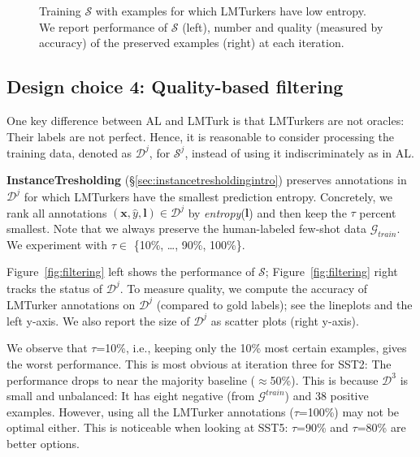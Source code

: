 \documentclass[11pt]{article}
\def\md{LMTurk\xspace}
\def\mdr{LMTurker\xspace}
\def\mdrs{LMTurkers\xspace}
\def\figref#1{Figure~\ref{fig:#1}}
\def\figlabel#1{\label{fig:#1}\label{p:#1}}
\def\secref#1{\S\ref{sec:#1}}
\def\seclabel#1{\label{sec:#1}}
\begin{document}
\begin{figure}[t]
{}
\vspace{-.25cm}
\caption{
  Training $\mathcal{S}$
  with
  examples for which \mdrs have low entropy.
  We report performance of $\mathcal{S}$ (left),
  number and quality (measured by accuracy) of the
  preserved examples (right) at each iteration.
}
\figlabel{filtering}
\end{figure}




\subsection{Design choice 4: Quality-based filtering}
\seclabel{poolfilter}
One key difference between AL and \md
is that \mdrs are not oracles:
Their labels are not perfect.
Hence, it is reasonable to
consider processing the training
data, denoted as $\mathcal{D}^{j}$, for $\mathcal{S}^{j}$, instead
of using it indiscriminately as in AL.


\textbf{InstanceTresholding} (\secref{instancetresholdingintro})
preserves
annotations
in $\mathcal{D}^{j}$
for which \mdrs
have the smallest
prediction entropy.
Concretely,
we rank all annotations
$(\mathbf{x}, \hat{y}, \mathbf{l}) \in \mathcal{D}^{j}$
by \emph{entropy}($\mathbf{l}$)
and then keep the
$\tau$ percent smallest.
Note that we always preserve the human-labeled
few-shot data $\mathcal{G}_{train}$.
We experiment
with $\tau \in$
\{10\%, \ldots, 90\%, 100\%\}.

\figref{filtering} left shows the
performance of $\mathcal{S}$;
\figref{filtering} right 
tracks the status of
$\mathcal{D}^{j}$.
To measure quality, we compute the accuracy
of \mdr annotations
on $\mathcal{D}^{j}$ (compared to gold labels);
see the lineplots and the left y-axis.
We also report the size
of $\mathcal{D}^{j}$ as
scatter plots (right y-axis).


We observe 
that $\tau$=10\%, i.e., keeping only
the 10\% most certain examples,
gives the worst performance.
This is most obvious at iteration three
for  SST2: The performance
drops to near the majority baseline ($\approx$50\%).
This is because $\mathcal{D}^{3}$
is small and unbalanced: It has
eight negative (from $\mathcal{G}^{train}$)
and 38 positive examples.
However, using
all the \mdr annotations
($\tau$=100\%) may not
be optimal either.
This is noticeable
when looking at SST5:
$\tau$=90\% and $\tau$=80\%
are better options.
\end{document}
